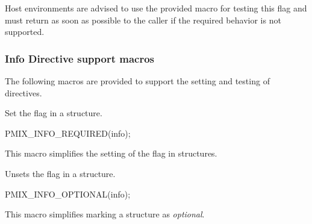 \advicermstart
Host environments are advised to use the provided  macro for testing this flag and must return  as soon as possible to the caller if the required behavior is not supported.
\advicermend


\subsubsection{Info Directive support macros}

The following macros are provided to support the setting and testing of  directives.


\summary

Set the  flag in a  structure.

\cspecificstart
\begin{codepar}
PMIX_INFO_REQUIRED(info);
\end{codepar}
\cspecificend

\begin{arglist}
\end{arglist}

This macro simplifies the setting of the  flag in  structures.


\summary
Unsets the  flag in a  structure.

\cspecificstart
\begin{codepar}
PMIX_INFO_OPTIONAL(info);
\end{codepar}
\cspecificend

\begin{arglist}
\end{arglist}

This macro simplifies marking a  structure as \textit{optional}.


